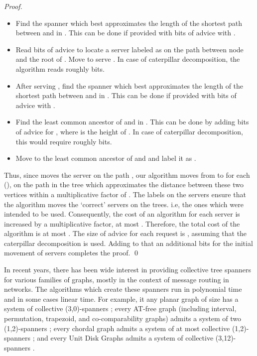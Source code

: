 \begin{proof}
\begin{itemize}
	\item Find the spanner  which best approximates the length of the shortest path between  and  in . This can be done if provided with 
	 bits of advice with .
	\item Read  bits of advice to locate a server  labeled as  on the path between node  and the root of . Move  to serve 
	. In case of caterpillar decomposition, the algorithm reads roughly  bits.
	\item After serving , find the spanner  which best approximates the length of the shortest path between  and  in . This can be done if provided with  bits of advice with .
	\item Find the least common ancestor of  and  in . This can be done by adding  bits of advice for , where  is the 
	height of . In case of caterpillar decomposition, this would require roughly  bits.
	\item Move  to the least common ancestor of  and  and label it as .
\end{itemize}

Thus, since \opt moves the server  on the path , our algorithm moves  from  to 
 for each  (), on the path in the tree which approximates the distance between these two vertices within a multiplicative factor 
of . The labels on the servers ensure that the algorithm moves the `correct' servers on the trees. i.e, the ones which were intended to be used. Consequently, the
cost of an algorithm for each server is increased by a multiplicative factor, at most . Therefore, the total cost of the algorithm is at most . 
The size of advice for each request is , assuming that the caterpillar decomposition is used. Adding to that an additional  
 bits for the initial movement of servers completes the proof. \qed
\end{proof}

In recent years, there has been wide interest in providing collective tree spanners for various families of graphs, mostly in the context of message routing in networks. The algorithms which create these spanners run in polynomial time and in some cases linear time. For example, it any planar graph of size  has a system of  collective (3,0)-spanners \cite{pezdisp}; every AT-free graph (including interval, permutation, trapezoid, and co-comparability graphs) admits a system of two (1,2)-spanners \cite{WG04}; every chordal graph admits a system of at most  collective (1,2)-spanners \cite{SWAT04}; and every Unit Disk Graphs admits a system of  collective (3,12)-spanners \cite{DUGSPANNER}. 


